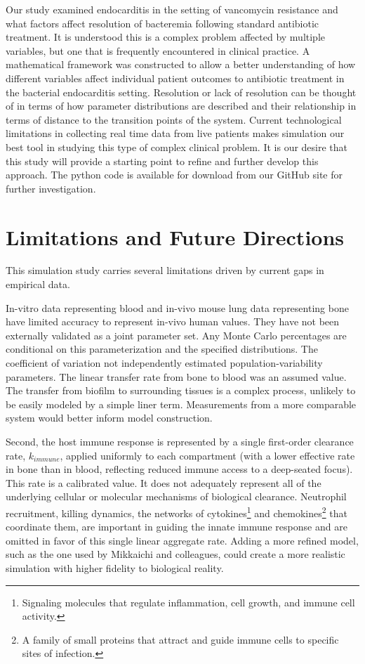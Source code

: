 \documentclass[12pt, draftcls, onecolumn]{IEEEtran}
\begin{document}
Our study examined endocarditis in the setting of vancomycin resistance and what factors affect resolution of bacteremia following standard antibiotic treatment.  It is understood this is a complex problem affected by multiple variables, but one that is frequently encountered in clinical practice.  A mathematical framework was constructed to allow a better understanding of how different variables affect individual patient outcomes to antibiotic treatment in the bacterial endocarditis setting. Resolution or lack of resolution can be thought of in terms of how parameter distributions are described and their relationship in terms of distance to the transition points of the system.  Current technological limitations in collecting real time data from live patients makes simulation our best tool in studying this type of complex clinical problem. It is our desire that this study will provide a starting point to refine and further develop this approach.  The python code is available for download from our GitHub site for further investigation.


\section{Limitations and Future Directions}

This simulation study carries several limitations driven by current gaps
in empirical data.

In-vitro data representing blood and in-vivo mouse lung data representing bone have limited accuracy to represent in-vivo human values.  They have not been externally validated as a joint parameter set. Any Monte Carlo percentages are conditional on this parameterization and the specified distributions. The coefficient of variation not independently estimated population-variability parameters. The linear transfer rate from bone to blood was an assumed value.  The transfer from biofilm to surrounding tissues is a complex process, unlikely to be easily modeled by a simple liner term. Measurements from a more comparable system would better inform model construction.  

Second, the host immune response is represented by a single first-order
clearance rate, $k_{immune}$, applied uniformly to each compartment (with
a lower effective rate in bone than in blood, reflecting reduced immune
access to a deep-seated focus). This rate is a calibrated value.  It does not adequately represent all of the underlying cellular or molecular mechanisms of biological clearance. Neutrophil recruitment, killing dynamics,
the networks of cytokines\footnote{Signaling molecules that regulate
inflammation, cell growth, and immune cell activity.} and
chemokines\footnote{A family of small proteins that attract and guide
immune cells to specific sites of infection.} that coordinate them, are
important in guiding the innate immune response and are omitted in favor of this single linear aggregate rate.  Adding a more refined model, such as the one used by Mikkaichi and colleagues, could create a more realistic simulation with higher fidelity to biological reality.
\end{document}

